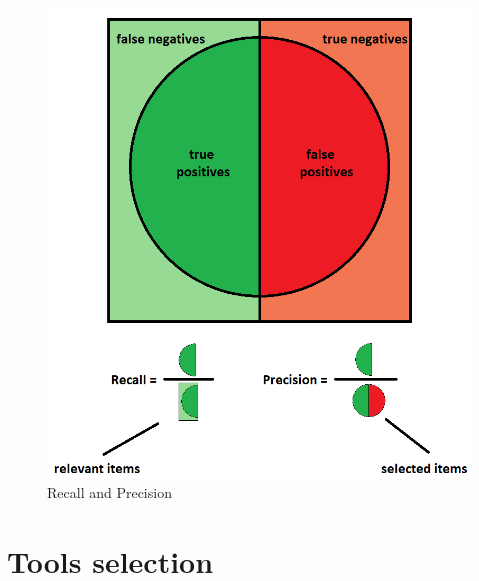 \begin{figure}[H]
    \centering
    \includegraphics[scale=0.5]{images/rpl}
    \caption{Recall and Precision}
    \label{fig:RPL}
\end{figure}

\section{Tools selection}
\label{sec:tools}

